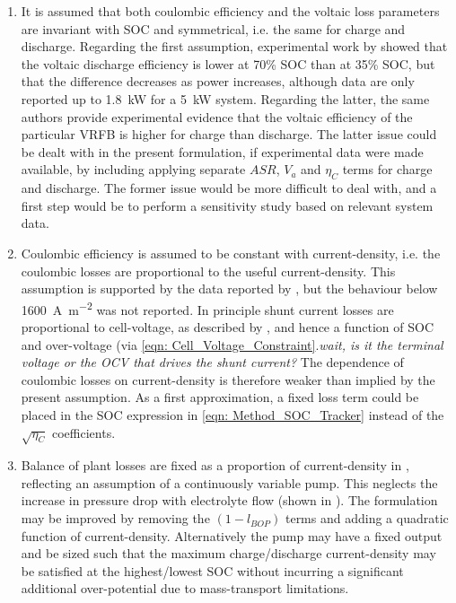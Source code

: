 \documentclass[preprint,3p,review,authoryear,10pt]{elsarticle}
\begin{document}
\begin{enumerate}

    \item It is assumed that both coulombic efficiency and the voltaic loss parameters are invariant with SOC and symmetrical, i.e. the same for charge and discharge. Regarding the first assumption, experimental work by \cite{Nguyen2014} showed that the voltaic discharge efficiency is lower at 70\% SOC than at 35\% SOC, but that the difference decreases as power increases, although data are only reported up to \SI{1.8}{\kilo\watt} for a \SI{5}{\kilo\watt} system. Regarding the latter, the same authors provide experimental evidence that the voltaic efficiency of the particular VRFB is higher for charge than discharge. The latter issue could be dealt with in the present formulation, if experimental data were made available, by including applying separate $ASR$, $V_a$ and $\eta_{C}$ terms for charge and discharge. The former issue would be more difficult to deal with, and a first step would be to perform a sensitivity study based on relevant system data.
    
    \item Coulombic efficiency is assumed to be constant with current-density, i.e. the coulombic losses are proportional to the useful current-density. This assumption is supported by the data reported by \cite{Reed2016}, but the behaviour below \SI{1600}{\ampere\per\square\meter} was not reported. In principle shunt current losses are proportional to cell-voltage, as described by \cite{Xing2011}, and hence a function of SOC and over-voltage (via \cref{eqn: Cell_Voltage_Constraint}.\emph{wait, is it the terminal voltage or the OCV that drives the shunt current?} The dependence of coulombic losses on current-density is therefore weaker than implied by the present assumption. As a first approximation, a fixed loss term could be placed in the SOC expression in \cref{eqn: Method_SOC_Tracker} instead of the $\sqrt{\eta_C}$ coefficients.
    
    \item Balance of plant losses are fixed as a proportion of current-density in , reflecting an assumption of a continuously variable pump. This neglects the increase in pressure drop with electrolyte flow (shown in \cite{Reed2016}). The formulation may be improved by removing the $(1-l_{BOP})$ terms and adding a quadratic function of current-density. Alternatively the pump may have a  fixed output and be sized such that the maximum charge/discharge current-density may be satisfied at the highest/lowest SOC without incurring a significant additional over-potential due to mass-transport limitations.
    

\end{enumerate}
\end{document}
